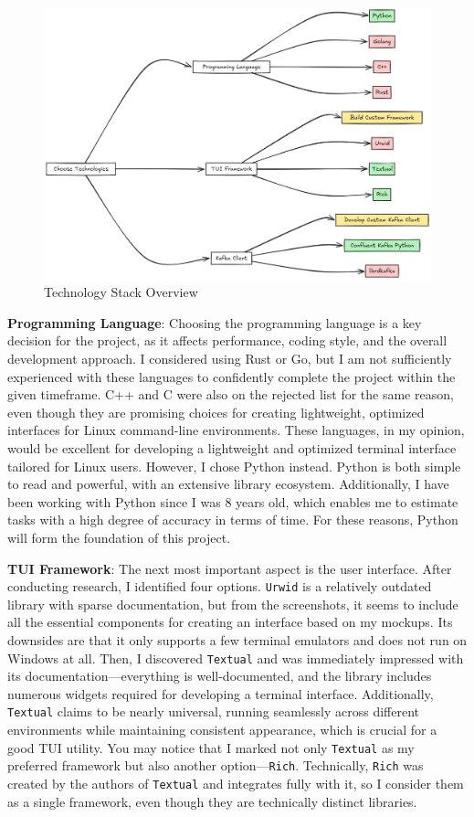 \documentclass[10pt , a4paper]{report}
\begin{document}
\begin{figure}[htbp]
    \centering
    \includegraphics[width=.8\linewidth]{imgs/TechDiagram.png}
    \caption{Technology Stack Overview}
    \label{fig:tech_chart}
\end{figure}

\textbf{Programming Language}: Choosing the programming language is a key decision for the project, as it affects performance, coding style, and the overall development approach. I considered using Rust or Go, but I am not sufficiently experienced with these languages to confidently complete the project within the given timeframe. C++ and C were also on the rejected list for the same reason, even though they are promising choices for creating lightweight, optimized interfaces for Linux command-line environments. These languages, in my opinion, would be excellent for developing a lightweight and optimized terminal interface tailored for Linux users. However, I chose Python instead. Python is both simple to read and powerful, with an extensive library ecosystem. Additionally, I have been working with Python since I was 8 years old, which enables me to estimate tasks with a high degree of accuracy in terms of time. For these reasons, Python will form the foundation of this project.

\textbf{TUI Framework}: The next most important aspect is the user interface. After conducting research, I identified four options. \texttt{Urwid} is a relatively outdated library with sparse documentation, but from the screenshots, it seems to include all the essential components for creating an interface based on my mockups. Its downsides are that it only supports a few terminal emulators and does not run on Windows at all. Then, I discovered \texttt{Textual} and was immediately impressed with its documentation—everything is well-documented, and the library includes numerous widgets required for developing a terminal interface. Additionally, \texttt{Textual} claims to be nearly universal, running seamlessly across different environments while maintaining consistent appearance, which is crucial for a good TUI utility. You may notice that I marked not only \texttt{Textual} as my preferred framework but also another option—\texttt{Rich}. Technically, \texttt{Rich} was created by the authors of \texttt{Textual} and integrates fully with it, so I consider them as a single framework, even though they are technically distinct libraries.
\end{document}
